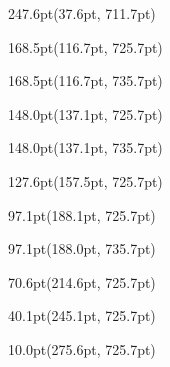 \documentclass{article}
\begin{document}
\begin{textblock*}{247.6pt}(37.6pt, 711.7pt)%
\noindent%
%
\end{textblock*}
\begin{textblock*}{168.5pt}(116.7pt, 725.7pt)%
\noindent%
%
\end{textblock*}
\begin{textblock*}{168.5pt}(116.7pt, 735.7pt)%
\noindent%
%
\end{textblock*}
\begin{textblock*}{148.0pt}(137.1pt, 725.7pt)%
\noindent%
%
\end{textblock*}
\begin{textblock*}{148.0pt}(137.1pt, 735.7pt)%
\noindent%
%
\end{textblock*}
\begin{textblock*}{127.6pt}(157.5pt, 725.7pt)%
\noindent%
%
\end{textblock*}
\begin{textblock*}{97.1pt}(188.1pt, 725.7pt)%
\noindent%
%
\end{textblock*}
\begin{textblock*}{97.1pt}(188.0pt, 735.7pt)%
\noindent%
%
\end{textblock*}
\begin{textblock*}{70.6pt}(214.6pt, 725.7pt)%
\noindent%
%
\end{textblock*}
\begin{textblock*}{40.1pt}(245.1pt, 725.7pt)%
\noindent%
%
\end{textblock*}
\begin{textblock*}{10.0pt}(275.6pt, 725.7pt)%
\noindent%
%
\end{textblock*}
\end{document}
